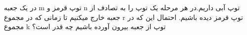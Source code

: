در یک جعبه m توپ قرمز و n توپ آبی داریم.در هر مرحله یک توپ را به تصادف از جعبه خارج میکنیم تا زمانی که در مجموع r توپ قرمز دیده باشیم. احتمال این که در مجموع k توپ از جعبه بیرون آورده باشیم چه قدر است؟ 
